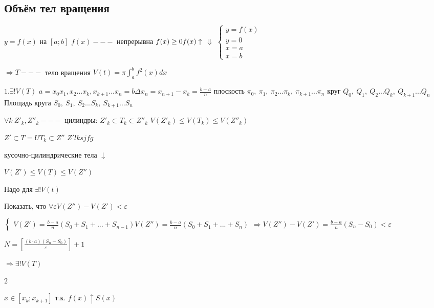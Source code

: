 \documentclass{article}
\begin{document}
    \subsection{Объём тел вращения} %


    \(y = f(x)\) на \([a;b]\)
    \(f(x) ---\) непрерывна
    \(f(x) \geq 0 \\ f(x) \uparrow\)
    \(\Downarrow\)
    \(\begin{cases}
        y = f(x)\\
        y = 0\\
        x = a\\
        x = b
    \end{cases}\)

    \(\Rightarrow T ---\) тело вращения \( V(t) = \pi \int_{a}^{b}f^2(x)dx\)

    \(1. \exists! V(T)\)
    \(a = x_0 x_1, x_2 ... x_k, x_{k+1} ... x_n = b   \Delta x_n = x_{n+1} - x_k = \frac{b- a}{n}\)
    плоскость \( \pi_0, \ \pi_1, \ \pi_2 ... \pi_k, \ \pi_{k+1} ... \pi_n\)
    круг \( Q_0, \ Q_1, \ Q_2 ... Q_k, \ Q_{k+1} ... Q_n\)
    Площадь круга \( S_0, \ S_1, \ S_2 ... S_k, \ S_{k+1} ... S_n\)

    \( \forall k \ Z'_k, Z''_k ---\) цилиндры:
    \( Z'_k \subset T_k \subset Z''_k \)
    \( V(Z'_k) \leq V(T_k) \leq V(Z''_k) \)

    \( Z' \subset T = U T_k \subset Z'' \)
    \( Z'lksjfg \)

    кусочно-цилиндрические тела
    \(\downarrow\)

    \( V(Z') \leq V(T) \leq V(Z'') \)

    Надо для \( \exists! V(t) \)

    Показать, что \( \forall \varepsilon V(Z'') - V(Z') < \varepsilon \)

    \(\begin{cases}
        V(Z') = \frac{b-a}{n} (S_0 + S_1 + ... + S_{n-1})
        V(Z'') = \frac{b-a}{n} (S_0 + S_1 + ... + S_{n})
    \end{cases} \Rightarrow V(Z'') - V(Z') = \frac{b-a}{n}(S_n - S_0) < \varepsilon\)

    \(N = [\frac{(b \cdot a)(S_n - S_0)}{\varepsilon}] + 1\)

    \(\Rightarrow \exists! V(T)\)

    \(2\) %

    \(x \in [x_k; x_{k+1}]\) т.к. \(f(x) \uparrow S(x)\)
\end{document}
